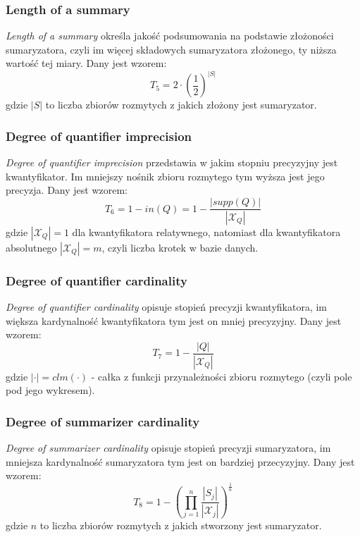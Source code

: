 \documentclass{classrep}
\begin{document}
	\subsubsection{Length of a summary}
\textsl{Length of a summary}  określa jakość podsumowania na podstawie złożoności sumaryzatora, czyli im więcej składowych sumaryzatora złożonego, ty niższa wartość tej miary. Dany jest wzorem:
\begin{equation}
T_5 = 2 \cdot \left( \frac{1}{2}\right)^{|S|} 
\end{equation}
gdzie $|S|$ to liczba zbiorów rozmytych z jakich złożony jest sumaryzator.


	\subsubsection{Degree of quantifier imprecision}
\textsl{Degree of quantifier imprecision} przedstawia w jakim stopniu precyzyjny jest kwantyfikator. Im mniejszy nośnik zbioru rozmytego  tym wyższa jest jego precyzja. Dany jest wzorem:
\begin{equation}
T_6 = 1 - in(Q) = 1 - \frac{|supp(Q)|}{|\mathcal{X}_Q|}
\end{equation}
gdzie $|\mathcal{X}_Q| = 1$ dla kwantyfikatora relatywnego, natomiast dla kwantyfikatora absolutnego $|\mathcal{X}_Q| = m$, czyli liczba krotek w bazie danych.


	\subsubsection{Degree of quantifier cardinality}
\textsl{Degree of quantifier cardinality} opisuje stopień precyzji kwantyfikatora, im większa kardynalność kwantyfikatora tym jest on mniej precyzyjny. Dany jest wzorem:
\begin{equation}
T_7 = 1 - \frac{|Q|}{|\mathcal{X}_Q|}
\end{equation}
gdzie $|\cdot| = clm(\cdot)$ - całka z funkcji przynależności zbioru rozmytego (czyli pole pod jego wykresem).


	\subsubsection{Degree of summarizer cardinality}
\textsl{Degree of summarizer cardinality} opisuje stopień precyzji sumaryzatora, im mniejsza kardynalność sumaryzatora tym jest on bardziej przecyzyjny. Dany jest wzorem:
\begin{equation}
T_8 = 1- \left(\prod_{j=1}^{n} \frac{|S_j|}{|\mathcal{X}_j|}\right)^{\frac{1}{n}}
\end{equation}
gdzie $n$ to liczba zbiorów rozmytych z jakich stworzony jest sumaryzator.
\end{document}
